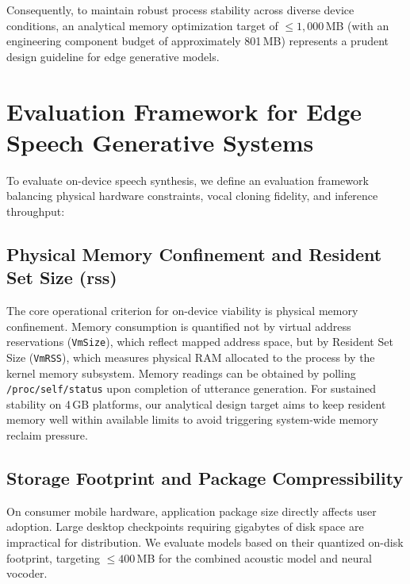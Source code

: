 Consequently, to maintain robust process stability across diverse device conditions, an analytical memory optimization target of $\le 1,000$\,MB (with an engineering component budget of approximately 801\,MB) represents a prudent design guideline for edge generative models.

\section{Evaluation Framework for Edge Speech Generative Systems}
To evaluate on-device speech synthesis, we define an evaluation framework balancing physical hardware constraints, vocal cloning fidelity, and inference throughput:

\subsection[Physical Memory Confinement and Resident Memory]{Physical Memory Confinement and Resident Set Size (\acrshort{rss})}
The core operational criterion for on-device viability is physical memory confinement. Memory consumption is quantified not by virtual address reservations (\texttt{VmSize}), which reflect mapped address space, but by Resident Set Size (\texttt{VmRSS}), which measures physical RAM allocated to the process by the kernel memory subsystem. Memory readings can be obtained by polling \texttt{/proc/self/status} upon completion of utterance generation. For sustained stability on 4\,GB platforms, our analytical design target aims to keep resident memory well within available limits to avoid triggering system-wide memory reclaim pressure.

\subsection{Storage Footprint and Package Compressibility}
On consumer mobile hardware, application package size directly affects user adoption. Large desktop checkpoints requiring gigabytes of disk space are impractical for distribution. We evaluate models based on their quantized on-disk footprint, targeting $\le 400$\,MB for the combined acoustic model and neural vocoder.

